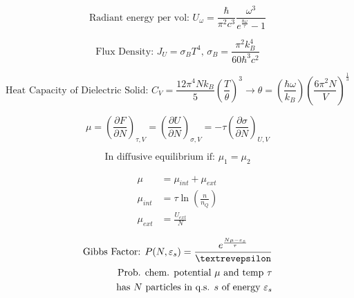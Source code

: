 \documentclass[12pt]{article}
\begin{document}
\vspace{-30pt}

\begin{multicols}{2}

  \begin{equation*}
    \text{Radiant energy per vol: }U_\omega=\frac{\hbar}{\pi^2c^3}\frac{\omega^3}{e^{\frac{\hbar\omega}{\tau}}-1}
  \end{equation*}

  \begin{equation*}
    \text{Flux Density: }J_U=\sigma_BT^4,\,\sigma_B=\frac{\pi^2k_B^4}{60\hbar^3c^2}
  \end{equation*}

\end{multicols}

\vspace{-20pt}

$$\text{Heat Capacity of Dielectric Solid: } C_V=\frac{12\pi^4Nk_B}{5}\left( \frac{T}{\theta} \right)^3\rightarrow\theta=\left( \frac{\hbar\omega}{k_B} \right)\left( \frac{6\pi^2N}{V} \right)^{\frac{1}{3}}$$

\begin{multicols}{2}

  \begin{equation*}
    \mu=\left( \frac{\partial F}{\partial N} \right)_{\tau,V}=\left( \frac{\partial U}{\partial N} \right)_{\sigma,V}=-\tau\left( \frac{\partial\sigma}{\partial N} \right)_{U,V}
  \end{equation*}

  \begin{equation*}
    \text{In diffusive equilibrium if: }\mu_1=\mu_2
  \end{equation*}

\end{multicols}

\begin{multicols}{2}

  \begin{equation*}
    \begin{split}
    \mu&=\mu_{int}+\mu_{ext}\\
    \mu_{int}&=\tau\ln\left( \frac{n}{n_Q} \right)\\
    \mu_{ext}&=\frac{U_{ext}}{N}
    \end{split}
  \end{equation*}

  \begin{equation*}
    \begin{split}
      \text{Gibbs Factor: }P(N,\varepsilon_s)=\frac{e^{\frac{N\mu-\varepsilon_s}{\tau}}}{\text{\textrevepsilon}}\\
      \text{Prob. chem. potential $\mu$ and temp $\tau$}\\
      \text{has $N$ particles in q.s. $s$ of energy $\varepsilon_s$}
    \end{split}
  \end{equation*}

\end{multicols}
\end{document}
